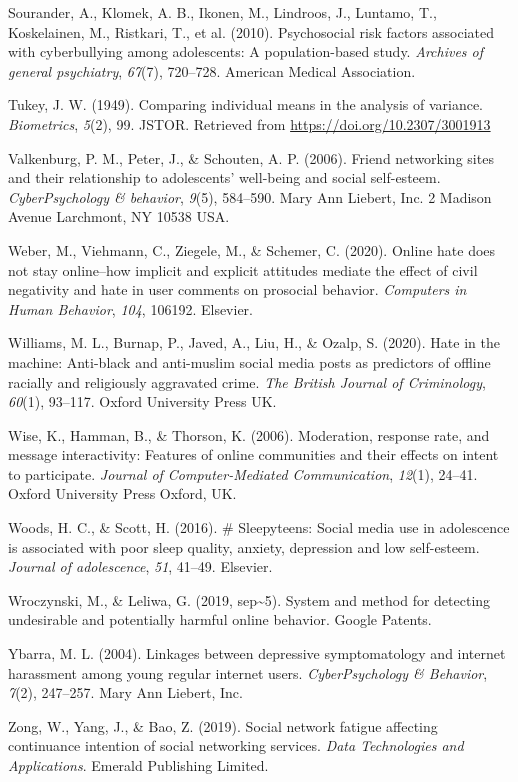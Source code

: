 \documentclass[10pt,dvipsnames]{scrartcl}
\begin{document}
\hypertarget{ref-sourander2010psychosocial}{}
Sourander, A., Klomek, A. B., Ikonen, M., Lindroos, J., Luntamo, T.,
Koskelainen, M., Ristkari, T., et al. (2010). Psychosocial risk factors
associated with cyberbullying among adolescents: A population-based
study. \emph{Archives of general psychiatry}, \emph{67}(7), 720--728.
American Medical Association.

\hypertarget{ref-Tukey1949}{}
Tukey, J. W. (1949). Comparing individual means in the analysis of
variance. \emph{Biometrics}, \emph{5}(2), 99. JSTOR. Retrieved from
\url{https://doi.org/10.2307/3001913}

\hypertarget{ref-valkenburg2006friend}{}
Valkenburg, P. M., Peter, J., \& Schouten, A. P. (2006). Friend
networking sites and their relationship to adolescents' well-being and
social self-esteem. \emph{CyberPsychology \& behavior}, \emph{9}(5),
584--590. Mary Ann Liebert, Inc. 2 Madison Avenue Larchmont, NY 10538
USA.

\hypertarget{ref-weber2020online}{}
Weber, M., Viehmann, C., Ziegele, M., \& Schemer, C. (2020). Online hate
does not stay online--how implicit and explicit attitudes mediate the
effect of civil negativity and hate in user comments on prosocial
behavior. \emph{Computers in Human Behavior}, \emph{104}, 106192.
Elsevier.

\hypertarget{ref-williams2020hate}{}
Williams, M. L., Burnap, P., Javed, A., Liu, H., \& Ozalp, S. (2020).
Hate in the machine: Anti-black and anti-muslim social media posts as
predictors of offline racially and religiously aggravated crime.
\emph{The British Journal of Criminology}, \emph{60}(1), 93--117. Oxford
University Press UK.

\hypertarget{ref-wise2006moderation}{}
Wise, K., Hamman, B., \& Thorson, K. (2006). Moderation, response rate,
and message interactivity: Features of online communities and their
effects on intent to participate. \emph{Journal of Computer-Mediated
Communication}, \emph{12}(1), 24--41. Oxford University Press Oxford,
UK.

\hypertarget{ref-woods2016sleepyteens}{}
Woods, H. C., \& Scott, H. (2016). \# Sleepyteens: Social media use in
adolescence is associated with poor sleep quality, anxiety, depression
and low self-esteem. \emph{Journal of adolescence}, \emph{51}, 41--49.
Elsevier.

\hypertarget{ref-wroczynski2019system}{}
Wroczynski, M., \& Leliwa, G. (2019, sep\textasciitilde{}5). System and
method for detecting undesirable and potentially harmful online
behavior. Google Patents.

\hypertarget{ref-ybarra2004linkages}{}
Ybarra, M. L. (2004). Linkages between depressive symptomatology and
internet harassment among young regular internet users.
\emph{CyberPsychology \& Behavior}, \emph{7}(2), 247--257. Mary Ann
Liebert, Inc.

\hypertarget{ref-zong2019social}{}
Zong, W., Yang, J., \& Bao, Z. (2019). Social network fatigue affecting
continuance intention of social networking services. \emph{Data
Technologies and Applications}. Emerald Publishing Limited.
\end{document}
